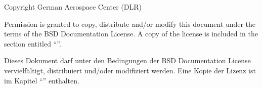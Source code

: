 \newpage

\thispagestyle{empty}

\mbox{}
\vfill

Copyright \textcopyright{} \the\year{}  German Aerospace Center (DLR)

Permission is granted to copy, distribute and/or modify this document under the terms of the BSD Documentation License.  A copy of the license is included in the section entitled ``''.

Dieses Dokument darf unter den Bedingungen der BSD Documentation License vervielf{\"a}ltigt, distribuiert und/oder modifiziert werden. Eine Kopie der Lizenz ist im Kapitel ``'' enthalten.%

\newpage
